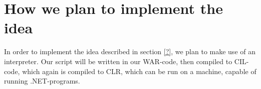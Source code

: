 \section*{How we plan to implement the idea}
In order to implement the idea described in section \ref{?}, we plan to make use of an interpreter. Our script will be written in our WAR-code, then compiled to CIL-code, which again is compiled to CLR, which can be run on a machine, capable of running .NET-programs. 
